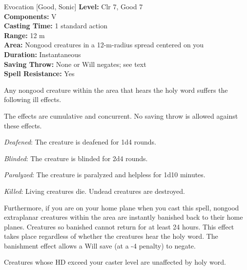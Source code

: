 {Evocation [Good, Sonic]}
{
	\textbf{Level:}
	Clr 7, Good 7\\
	\textbf{Components:}
	V\\
	\textbf{Casting Time:}
	1 standard action\\
	\textbf{Range:}
	12 m\\
	\textbf{Area:}
	Nongood creatures in a 12-m-radius spread centered on you\\
	\textbf{Duration:}
	Instantaneous\\
	\textbf{Saving Throw:}
	None or Will negates; see text\\
	\textbf{Spell Resistance:}
	Yes\\
}
{
	Any nongood creature within the area that hears the holy word suffers the following ill effects.


	The effects are cumulative and concurrent. No saving throw is allowed against these effects.

	\textit{Deafened}:
	The creature is deafened for 1d4 rounds.

	\textit{Blinded}:
	The creature is blinded for 2d4 rounds.

	\textit{Paralyzed}:
	The creature is paralyzed and helpless for 1d10 minutes.

	\textit{Killed}:
	Living creatures die. Undead creatures are destroyed.

	Furthermore, if you are on your home plane when you cast this spell, nongood extraplanar creatures within the area are instantly banished back to their home planes. Creatures so banished cannot return for at least 24 hours. This effect takes place regardless of whether the creatures hear the holy word. The banishment effect allows a Will save (at a -4 penalty) to negate.

	Creatures whose HD exceed your caster level are unaffected by holy word.

}
